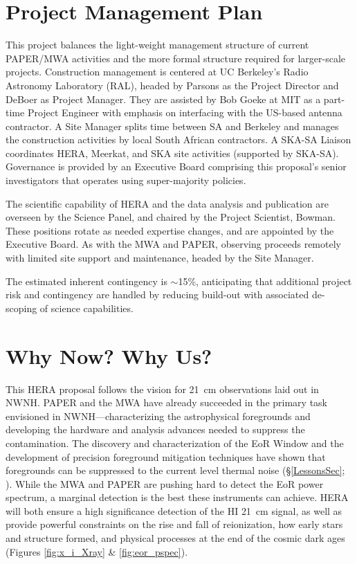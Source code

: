 \documentclass[preprint]{aastex}
\def\HI{{H{\small I }}}
\begin{document}
\vspace{-0.25in}
\section{Project Management Plan}
\label{PMPsec}

This project balances the light-weight management structure of current PAPER/MWA
activities and the more formal structure required for larger-scale projects.
Construction management is centered at UC Berkeley's Radio Astronomy Laboratory
(RAL), headed by Parsons as the Project Director and DeBoer as
Project Manager. They are assisted by Bob Goeke at MIT as a part-time
Project Engineer with emphasis on interfacing with the US-based
antenna contractor.  A Site Manager splits time between SA
and Berkeley and manages the construction activities by local South African
contractors. A SKA-SA Liaison coordinates HERA, Meerkat, and SKA site
activities (supported by SKA-SA). Governance is provided by an Executive Board comprising
this proposal's senior investigators that operates using
super-majority policies. 

The scientific capability of HERA and the data analysis and publication are
overseen by the Science Panel, and chaired by the Project Scientist, Bowman. These
positions rotate as needed expertise changes, and are appointed by the
Executive Board.  As with the MWA and PAPER, observing
proceeds remotely with limited site support
and maintenance, headed by the Site Manager.

The estimated inherent contingency is $\sim$15\%, anticipating that additional project 
risk and contingency are handled by reducing
build-out with associated de-scoping of science capabilities.

\vspace{-0.25in}
\section{Why Now? Why Us?}

This HERA proposal follows the vision for 21~cm observations laid out in NWNH.
PAPER and the MWA have already succeeded in the primary task envisioned in
NWNH---characterizing the astrophysical foregrounds and developing the hardware
and analysis advances needed to suppress the contamination. The discovery and
characterization of the EoR Window and the development of precision foreground
mitigation techniques have shown that foregrounds can be suppressed to the current level
thermal noise (\S \ref{LessonsSec}; \citealt{parsons_et_al2013}). While the MWA
and PAPER are pushing hard to detect the EoR power spectrum, %
a marginal detection is the best these instruments can achieve.
HERA will both ensure a high significance detection of the \HI 21~cm signal, as
well as provide powerful constraints on the rise and fall of reionization, how
early stars and structure formed, and physical processes at the end of the
cosmic dark ages (Figures \ref{fig:x_i_Xray} \& \ref{fig:eor_pspec}).
\end{document}

